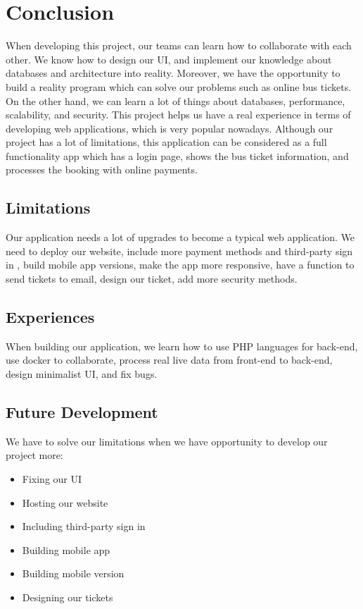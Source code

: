 \section{Conclusion}
\noindent When developing this project, our teams can learn how to collaborate with each other. We know how to design our UI, and implement our knowledge about databases and architecture into reality. Moreover, we have the opportunity to build a reality program which can solve our problems such as online bus tickets. On the other hand, we can learn a lot of things about databases, performance, scalability, and security. This project helps us have a real experience in terms of developing web applications, which is very popular nowadays. Although our project has a lot of limitations, this application can be considered as a full functionality app which has a login page, shows the bus ticket information, and processes the booking with online payments.

\subsection{Limitations}
\noindent Our application needs a lot of upgrades to become a typical web application. We need to deploy our website, include more payment methods and third-party sign in , build mobile app versions, make the app more responsive, have a function to send tickets to email, design our ticket, add more security methods.

\subsection{Experiences}
\noindent When building our application, we learn how to use PHP languages for back-end, use docker to collaborate, process real live data from front-end to back-end, design minimalist UI, and fix bugs. 

\subsection{Future Development}
\noindent We have to solve our limitations when we have opportunity to develop our project more:
\begin{itemize}
    \item Fixing our UI
    \item Hosting our website
    \item Including third-party sign in
    \item Building mobile app
    \item Building mobile version
    \item Designing our tickets
\end{itemize}
